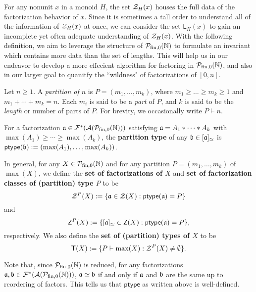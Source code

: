 For any nonunit $x$ in a monoid $H$, the set $\Z_H(x)$ houses the full data of the factorization behavior of $x$. 
Since it is sometimes a tall order to understand all of the information of $\Z_H(x)$ at once, we can consider the set $\mathsf{L}_H(x)$ to gain an incomplete yet often adequate understanding of $\Z_H(x)$.
With the following definition, we aim to leverage the structure of $\PN$ to formulate an invariant which contains more data than the set of lengths.
This will help us in our endeavor to develop a more effecient algorithm for factoring in $\PN$, and also in our larger goal to quanitfy the ``wildness" of factorizations of $[ 0,n]$.


\begin{defn} \label{def:partition type}
	Let $n\ge 1$. A \textit{partition of $n$} is $P = (m_1,\dots, m_k)$, where $m_1 \ge \dots \ge m_k \ge 1$ and $m_1+\cdots + m_k = n$. 
	Each $m_i$ is said to be a \textit{part} of $P$, and $k$ is said to be the \textit{length} or number of parts of $P$.
	For brevity, we occasionally write $P \vdash n$.
	
	For a factorization $\aa \in \F^*(\A(\PN))$ satisfying $\aa = A_1*\cdots*A_k$ with $\max(A_1)\ge\cdots\ge\max(A_k)$, the \textbf{partition type} of any $\bb\in [\aa]_\simeq$ is $\mathsf{ptype}(\bb) := (\max(A_1),\dots,\max(A_k))$.
	
	In general, for any $X \in \PN$ and for any partition $P = (m_1,\dots, m_k)$ of $\max(X)$, we define the \textbf{set of factorizations of $X$} and \textbf{set of factorization classes of (partition) type $P$} to be
	\[ \Z^P(X) := \{ \aa \in \Z(X) : \mathsf{ptype}(\aa) = P \} \]
	and
	\[\mathsf{Z}^P(X) := \{ [\aa]_\simeq \in \mathsf{Z}(X): \mathsf{ptype}(\aa) = P \},\]
	respectively.
	We also define the \textbf{set of (partition) types of $X$} to be
	\[ \mathsf{T}(X) :=  \{ P \vdash \max(X) : \Z^P(X) \neq \emptyset \}. \]
\end{defn}

Note that, since $\PN$ is reduced, for any factorizations $\aa,\bb\in \F^*(\A(\PN))$, $\aa \simeq \bb$ if and only if $\aa$ and $\bb$ are the same up to reordering of factors.  
This tells us that $\mathsf{ptype}$ as written above is well-defined.

